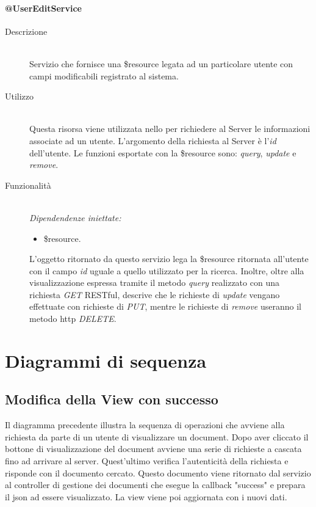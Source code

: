 \paragraph{@UserEditService}
\begin{description}
 \item[Descrizione] \hfill \\
 Servizio che fornisce una \$resource legata ad un particolare utente con campi modificabili registrato al sistema.
 \item[Utilizzo] \hfill \\
  Questa risorsa viene utilizzata nello  per richiedere al Server le informazioni associate ad un utente. L'argomento della richiesta al 
  Server è l'\textit{id} dell'utente. Le funzioni esportate con la \$resource sono: \textit{query}, \textit{update} e 
  \textit{remove}.
 \item[Funzionalità] \hfill \\
 \emph{Dipendendenze iniettate:}
 \begin{itemize}
  \item \$resource.
 \end{itemize}
  L'oggetto ritornato da questo servizio lega la \$resource ritornata all'utente con il campo 
  \textit{id} uguale a quello utilizzato per la ricerca. Inoltre, oltre alla visualizzazione espressa tramite il metodo \textit{query} realizzato con una richiesta \textit{GET} RESTful, descrive che le richieste di \textit{update} vengano effettuate con richieste di \textit{PUT}, mentre le richieste di \textit{remove} useranno il metodo http \textit{DELETE}.
\end{description}


\newpage


\section{Diagrammi di sequenza}
\label{sequenza}
\subsection{Modifica della View con successo}
Il diagramma precedente illustra la sequenza di operazioni che avviene alla richiesta da parte di un utente di visualizzare un document.
Dopo aver cliccato il bottone di visualizzazione del document avviene una serie di richieste a cascata fino ad arrivare al server. Quest'ultimo verifica l'autenticità della richiesta e risponde con il documento cercato.
Questo documento viene ritornato dal servizio al controller di gestione dei documenti che esegue la callback "success" e prepara il json ad essere visualizzato.
La view viene poi aggiornata con i nuovi dati.

